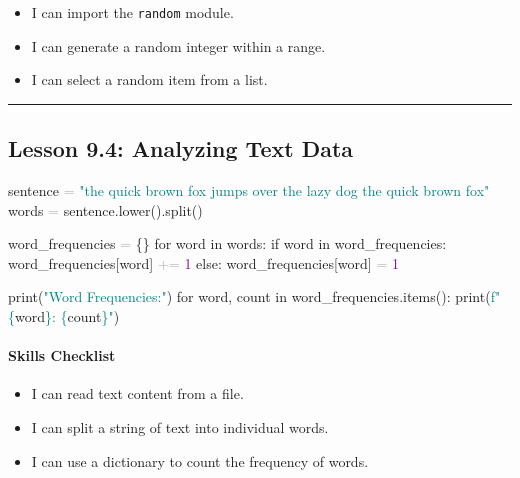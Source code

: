\documentclass[
  justified,
  openright,
]{tufte-book}
\let\subsubsection\paragraph
\let\paragraph\paragraph
\newcommand{\BuiltInTok}[1]{#1}
\newcommand{\ControlFlowTok}[1]{\textcolor{BrandBlue}{#1}}
\newcommand{\DecValTok}[1]{\textcolor{Purple}{#1}}
\newcommand{\KeywordTok}[1]{\textcolor{BrandBlue}{#1}}
\newcommand{\NormalTok}[1]{#1}
\newcommand{\OperatorTok}[1]{\textcolor{DarkGray}{#1}}
\newcommand{\SpecialCharTok}[1]{\textcolor{Teal}{#1}}
\newcommand{\SpecialStringTok}[1]{\textcolor{Teal}{#1}}
\newcommand{\StringTok}[1]{\textcolor{Teal}{#1}}
\newenvironment{Shaded}{%
  \begin{snugshade}
}{%
  \end{snugshade}
}
\let\subsubsection\paragraph
\let\paragraph\paragraph
\providecommand{\tightlist}{%
  \setlength{\itemsep}{0pt}\setlength{\parskip}{0pt}}
\begin{document}
\begin{itemize}
\tightlist
\item[$\square$]
  I can import the \texttt{random} module.
\item[$\square$]
  I can generate a random integer within a range.
\item[$\square$]
  I can select a random item from a list.
\end{itemize}

\begin{center}\rule{0.5\linewidth}{0.5pt}\end{center}

\subsection{Lesson 9.4: Analyzing Text
Data}\label{lesson-9.4-analyzing-text-data}

\begin{Shaded}
\begin{Highlighting}[]
\NormalTok{sentence }\OperatorTok{=} \StringTok{"the quick brown fox jumps over the lazy dog the quick brown fox"}
\NormalTok{words }\OperatorTok{=}\NormalTok{ sentence.lower().split()}

\NormalTok{word\_frequencies }\OperatorTok{=}\NormalTok{ \{\}}
\ControlFlowTok{for}\NormalTok{ word }\KeywordTok{in}\NormalTok{ words:}
    \ControlFlowTok{if}\NormalTok{ word }\KeywordTok{in}\NormalTok{ word\_frequencies:}
\NormalTok{        word\_frequencies[word] }\OperatorTok{+=} \DecValTok{1}
    \ControlFlowTok{else}\NormalTok{:}
\NormalTok{        word\_frequencies[word] }\OperatorTok{=} \DecValTok{1}

\BuiltInTok{print}\NormalTok{(}\StringTok{"Word Frequencies:"}\NormalTok{)}
\ControlFlowTok{for}\NormalTok{ word, count }\KeywordTok{in}\NormalTok{ word\_frequencies.items():}
    \BuiltInTok{print}\NormalTok{(}\SpecialStringTok{f"\textquotesingle{}}\SpecialCharTok{\{}\NormalTok{word}\SpecialCharTok{\}}\SpecialStringTok{\textquotesingle{}: }\SpecialCharTok{\{}\NormalTok{count}\SpecialCharTok{\}}\SpecialStringTok{"}\NormalTok{)}
\end{Highlighting}
\end{Shaded}

\subsubsection{Skills Checklist}\label{skills-checklist-45}

\begin{itemize}
\tightlist
\item[$\square$]
  I can read text content from a file.
\item[$\square$]
  I can split a string of text into individual words.
\item[$\square$]
  I can use a dictionary to count the frequency of words.
\end{itemize}
\end{document}
